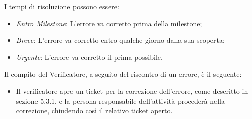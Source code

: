 I tempi di risoluzione possono essere:
\begin{itemize}
\item \emph{Entro Milestone}: L'errore va corretto prima della milestone;
\item \emph{Breve}: L'errore va corretto entro qualche giorno dalla sua scoperta;
\item \emph{Urgente}: L'errore va corretto il prima possibile.
\end{itemize}

Il compito del Verificatore, a seguito del riscontro di un errore, è il seguente:
\begin{itemize}
\item {} Il verificatore apre un ticket per la correzione dell'errore, come descritto in sezione 5.3.1, e la persona responsabile dell'attività procederà nella correzione, chiudendo così il relativo ticket aperto.
\end{itemize}

